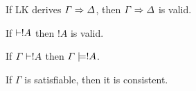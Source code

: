 \documentclass[open-logic-section]{subfiles}
\begin{document}


\begin{thm}
If LK derives $\Gamma \Rightarrow \Delta$, then $\Gamma \Rightarrow \Delta$
is valid.
\end{thm}

\begin{thm}
If $\Proves !A$ then $!A$ is valid.
\end{thm}

\begin{thm}
If $\Gamma \Proves !A$ then $\Gamma \Entails !A$.
\end{thm}

\begin{thm}
If $\Gamma$ is satisfiable, then it is consistent.
\end{thm}
\end{document}
